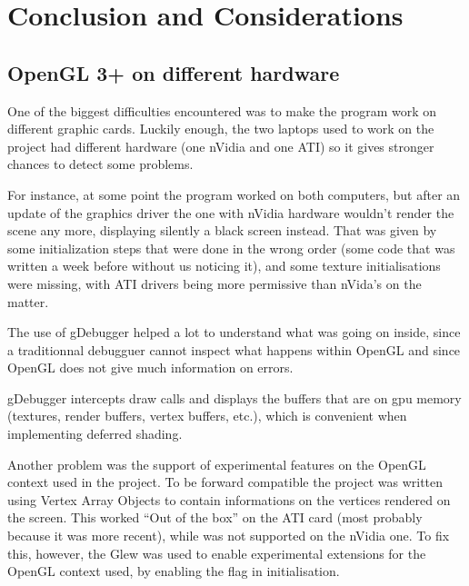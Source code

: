 \chapter{Conclusion and Considerations}

\section{OpenGL 3+ on different hardware}

One of the biggest difficulties encountered was to make the program work on
different graphic cards. Luckily enough, the two laptops used to work on the project had different
hardware (one nVidia and one ATI) so it gives stronger chances to detect some problems.
 
For instance, at some point the program worked on both computers, but after an update
of the graphics driver the one with nVidia hardware wouldn't render the scene any more, displaying
silently a black screen instead. That was given by some initialization steps that were
done in the wrong order (some code that was written a week before without us noticing it),
and some texture initialisations were missing, with ATI drivers being more permissive than nVida's on
the matter.

The use of gDebugger helped a lot to understand what was going on inside,
since a traditionnal debugguer cannot inspect what happens within OpenGL and since OpenGL
does not give much information on errors.

gDebugger intercepts draw calls and displays the buffers that are
on gpu memory (textures, render buffers, vertex buffers, etc.), which is convenient
when implementing deferred shading.

Another problem was the support of experimental features on the OpenGL context used
in the project. To be forward compatible the project was written using Vertex
Array Objects to contain informations on the vertices rendered on the screen.
This worked ``Out of the box'' on the ATI card (most probably because it was
more recent), while was not supported on the nVidia one. To fix this, however,
the Glew was used to enable experimental extensions for the OpenGL context used,
by enabling the  flag in initialisation.
